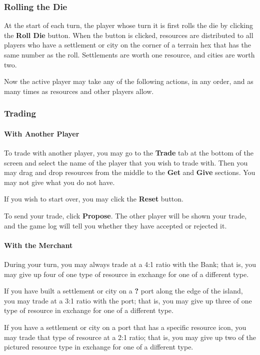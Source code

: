 \documentclass[12pt,letterpaper,titlepage]{article}
\begin{document}
		\subsubsection{Rolling the Die}
		At the start of each turn, the player whose turn it is first rolls the die by clicking the \textbf{Roll Die} button. When the button is clicked, resources are distributed to all players who have a settlement or city on the corner of a terrain hex that has the same number as the roll. Settlements are worth one resource, and cities are worth two.
		
		Now the active player may take any of the following actions, in any order, and as many times as resources and other players allow.
		
		\subsubsection{Trading}
			\paragraph{With Another Player}
			To trade with another player, you may go to the \textbf{Trade} tab at the bottom of the screen and select the name of the player that you wish to trade with. Then you may drag and drop resources from the middle to the \textbf{Get} and \textbf{Give} sections. You may not give what you do not have.
		
			If you wish to start over, you may click the \textbf{Reset} button.
		
			To send your trade, click \textbf{Propose}. The other player will be shown your trade, and the game log will tell you whether they have accepted or rejected it.
		
			\paragraph{With the Merchant}
			During your turn, you may always trade at a 4:1 ratio with the Bank; that is, you may give up four of one type of resource in exchange for one of a different type.
		
			If you have built a settlement or city on a \textbf{?} port along the edge of the island, you may trade at a 3:1 ratio with the port; that is, you may give up three of one type of resource in exchange for one of a different type.
		
			If you have a settlement or city on a port that has a specific resource icon, you may trade that type of resource at a 2:1 ratio; that is, you may give up two of the pictured resource type in exchange for one of a different type.
		
\end{document}
